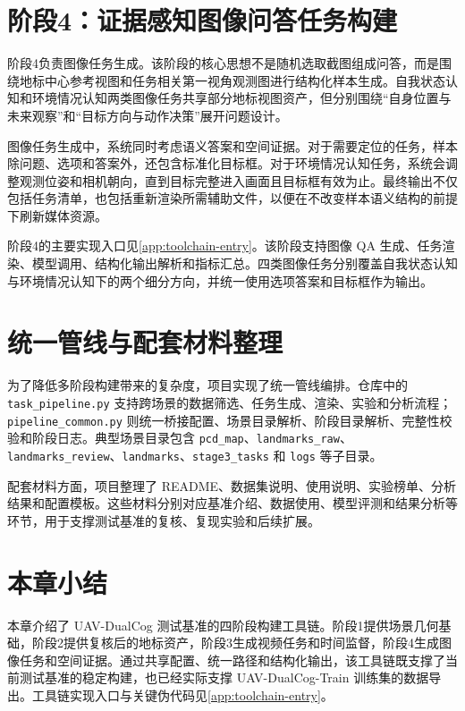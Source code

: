 \section{阶段4：证据感知图像问答任务构建}

阶段4负责图像任务生成。该阶段的核心思想不是随机选取截图组成问答，而是围绕地标中心参考视图和任务相关第一视角观测图进行结构化样本生成。自我状态认知和环境情况认知两类图像任务共享部分地标视图资产，但分别围绕“自身位置与未来观察”和“目标方向与动作决策”展开问题设计。

图像任务生成中，系统同时考虑语义答案和空间证据。对于需要定位的任务，样本除问题、选项和答案外，还包含标准化目标框。对于环境情况认知任务，系统会调整观测位姿和相机朝向，直到目标完整进入画面且目标框有效为止。最终输出不仅包括任务清单，也包括重新渲染所需辅助文件，以便在不改变样本语义结构的前提下刷新媒体资源。

阶段4的主要实现入口见\autoref{app:toolchain-entry}。该阶段支持图像 QA 生成、任务渲染、模型调用、结构化输出解析和指标汇总。四类图像任务分别覆盖自我状态认知与环境情况认知下的两个细分方向，并统一使用选项答案和目标框作为输出。

\section{统一管线与配套材料整理}

为了降低多阶段构建带来的复杂度，项目实现了统一管线编排。仓库中的 \texttt{task\_pipeline.py} 支持跨场景的数据筛选、任务生成、渲染、实验和分析流程；\texttt{pipeline\_common.py} 则统一桥接配置、场景目录解析、阶段目录解析、完整性校验和阶段日志。典型场景目录包含 \texttt{pcd\_map}、\texttt{landmarks\_raw}、\texttt{landmarks\_review}、\texttt{landmarks}、\texttt{stage3\_tasks} 和 \texttt{logs} 等子目录。

配套材料方面，项目整理了 README、数据集说明、使用说明、实验榜单、分析结果和配置模板。这些材料分别对应基准介绍、数据使用、模型评测和结果分析等环节，用于支撑测试基准的复核、复现实验和后续扩展。

\section{本章小结}

本章介绍了 UAV-DualCog 测试基准的四阶段构建工具链。阶段1提供场景几何基础，阶段2提供复核后的地标资产，阶段3生成视频任务和时间监督，阶段4生成图像任务和空间证据。通过共享配置、统一路径和结构化输出，该工具链既支撑了当前测试基准的稳定构建，也已经实际支撑 UAV-DualCog-Train 训练集的数据导出。工具链实现入口与关键伪代码见\autoref{app:toolchain-entry}。
